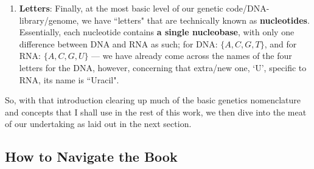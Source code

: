 \documentclass[a4paper, 18pt]{book} %
\begin{document}
\begin{enumerate}
\item \textbf{Letters}: Finally, at the most basic level of our genetic code/DNA-library/genome, we have ``letters" that are technically known as \textbf{nucleotides}. Essentially, each nucleotide contains \textbf{a single nucleobase}, with only one difference between DNA and RNA as such; for DNA: $\{A, C, G, T\}$, and for RNA: $\{A, C, G, U\}$ --- we have already come across the names of the four letters for the DNA, however, concerning that extra/new one, `U', specific to RNA, its name is ``Uracil".
\end{enumerate}


So, with that introduction clearing up much of the basic genetics nomenclature and concepts that I shall use in the rest of this work, we then dive into the meat of our undertaking as laid out in the next section.

\subsection{How to Navigate the Book}
\label{SECHOWTONAV}
\end{document}
